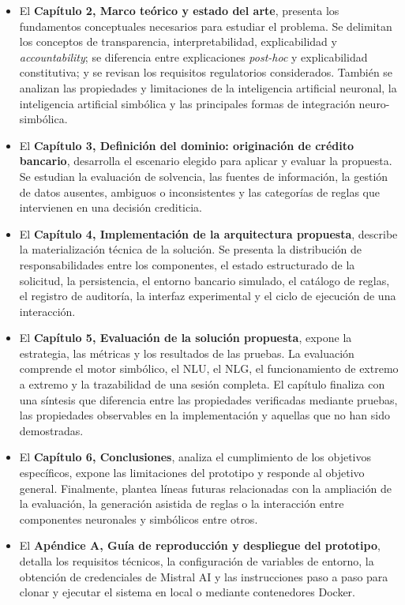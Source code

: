 \documentclass[12pt,a4paper]{report}
\begin{document}
\begin{itemize}
    \item El \textbf{Capítulo 2, Marco teórico y estado del arte}, presenta los fundamentos conceptuales necesarios para estudiar el problema. Se delimitan los conceptos de transparencia, interpretabilidad, explicabilidad y \textit{accountability}; se diferencia entre explicaciones \textit{post-hoc} y explicabilidad constitutiva; y se revisan los requisitos regulatorios considerados. También se analizan las propiedades y limitaciones de la inteligencia artificial neuronal, la inteligencia artificial simbólica y las principales formas de integración neuro-simbólica.

    \item El \textbf{Capítulo 3, Definición del dominio: originación de crédito bancario}, desarrolla el escenario elegido para aplicar y evaluar la propuesta. Se estudian la evaluación de solvencia, las fuentes de información, la gestión de datos ausentes, ambiguos o inconsistentes y las categorías de reglas que intervienen en una decisión crediticia.

    \item El \textbf{Capítulo 4, Implementación de la arquitectura propuesta}, describe la materialización técnica de la solución. Se presenta la distribución de responsabilidades entre los componentes, el estado estructurado de la solicitud, la persistencia, el entorno bancario simulado, el catálogo de reglas, el registro de auditoría, la interfaz experimental y el ciclo de ejecución de una interacción.

    \item El \textbf{Capítulo 5, Evaluación de la solución propuesta}, expone la estrategia, las métricas y los resultados de las pruebas. La evaluación comprende el motor simbólico, el NLU, el NLG, el funcionamiento de extremo a extremo y la trazabilidad de una sesión completa. El capítulo finaliza con una síntesis que diferencia entre las propiedades verificadas mediante pruebas, las propiedades observables en la implementación y aquellas que no han sido demostradas.

    \item El \textbf{Capítulo 6, Conclusiones}, analiza el cumplimiento de los objetivos específicos, expone las limitaciones del prototipo y responde al objetivo general. Finalmente, plantea líneas futuras relacionadas con la ampliación de la evaluación, la generación asistida de reglas o la interacción entre componentes neuronales y simbólicos entre otros.

    \item El \textbf{Apéndice A, Guía de reproducción y despliegue del prototipo}, detalla los requisitos técnicos, la configuración de variables de entorno, la obtención de credenciales de Mistral AI y las instrucciones paso a paso para clonar y ejecutar el sistema en local o mediante contenedores Docker.
\end{itemize}
\end{document}
